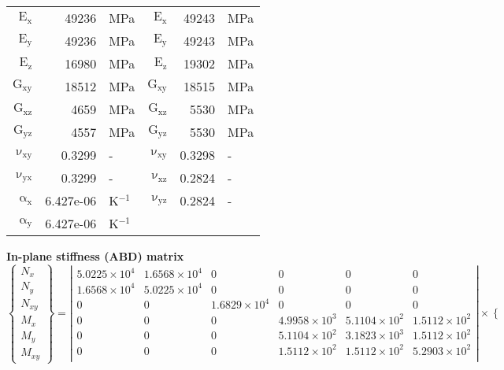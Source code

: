 \begin{table}[!htbp]
\begin{tabular}[t]{rrlrrl}
      $\mathrm{E_x}$ &    49236 & MPa & $\mathrm{E_x}$ &    49243 & MPa\\
      $\mathrm{E_y}$ &    49236 & MPa & $\mathrm{E_y}$ &    49243 & MPa\\
      $\mathrm{E_z}$ &    16980 & MPa & $\mathrm{E_z}$ &    19302 & MPa\\
      $\mathrm{G_{xy}}$ &    18512 & MPa & $\mathrm{G_{xy}}$ &    18515 & MPa\\
      $\mathrm{G_{xz}}$ &     4659 & MPa & $\mathrm{G_{xz}}$ &     5530 & MPa\\
      $\mathrm{G_{yz}}$ &     4557 & MPa &  $\mathrm{G_{yz}}$ &     5530 & MPa\\
      $\mathrm{\nu_{xy}}$ & 0.3299 &- &$\mathrm{\nu_{xy}}$ & 0.3298 &-\\
      $\mathrm{\nu_{yx}}$ & 0.3299 &- & $\mathrm{\nu_{xz}}$ & 0.2824 &-\\
      $\mathrm{\alpha_x}$ & 6.427e-06 & K$^{-1}$ &$\mathrm{\nu_{yz}}$ & 0.2824 &-\\
      $\mathrm{\alpha_y}$ & 6.427e-06 & K$^{-1}$\\
      \bottomrule
    \end{tabular}
  \vbox{
    \vbox{\small\textbf{In-plane stiffness (ABD) matrix}\\[-3mm]
      \tiny\[\left\{\begin{array}{c}
          N_x\\ N_y\\ N_{xy}\\ M_x\\ M_y\\ M_{xy}
        \end{array}\right\} = 
      \left|\begin{array}{cccccc}
           5.0225\times 10^{4} &  1.6568\times 10^{4} & 0 & 0 & 0 & 0\\
           1.6568\times 10^{4} &  5.0225\times 10^{4} & 0 & 0 & 0 & 0\\
          0 & 0 &  1.6829\times 10^{4} & 0 & 0 & 0\\
          0 & 0 & 0 &  4.9958\times 10^{3} &  5.1104\times 10^{2} &  1.5112\times 10^{2}\\
          0 & 0 & 0 &  5.1104\times 10^{2} &  3.1823\times 10^{3} &  1.5112\times 10^{2}\\
          0 & 0 & 0 &  1.5112\times 10^{2} &  1.5112\times 10^{2} &  5.2903\times 10^{2}\\
          \end{array}\right| \times
        \left\{\begin{array}{c}

\end{array}\]}}
\end{table}
